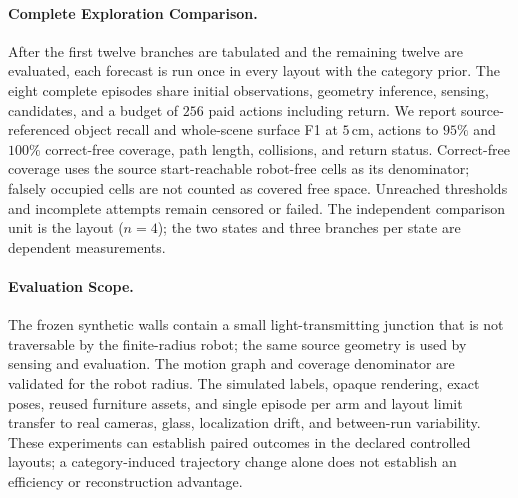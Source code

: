 \paragraph{Complete Exploration Comparison.}
After the first twelve branches are tabulated and the remaining twelve are evaluated, each forecast is run once in every layout with the category prior. The eight complete episodes share initial observations, geometry inference, sensing, candidates, and a budget of $256$ paid actions including return. We report source-referenced object recall and whole-scene surface F1 at $5\,$cm, actions to $95\%$ and $100\%$ correct-free coverage, path length, collisions, and return status. Correct-free coverage uses the source start-reachable robot-free cells as its denominator; falsely occupied cells are not counted as covered free space. Unreached thresholds and incomplete attempts remain censored or failed. The independent comparison unit is the layout ($n=4$); the two states and three branches per state are dependent measurements.

\paragraph{Evaluation Scope.}
The frozen synthetic walls contain a small light-transmitting junction that is not traversable by the finite-radius robot; the same source geometry is used by sensing and evaluation. The motion graph and coverage denominator are validated for the robot radius. The simulated labels, opaque rendering, exact poses, reused furniture assets, and single episode per arm and layout limit transfer to real cameras, glass, localization drift, and between-run variability. These experiments can establish paired outcomes in the declared controlled layouts; a category-induced trajectory change alone does not establish an efficiency or reconstruction advantage.
